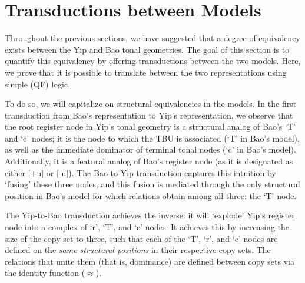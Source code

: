 \documentclass{article}
\newcommand{\ap}{\approx}
\begin{document}
\section{Transductions between Models}
Throughout the previous sections, we have suggested that a degree of equivalency exists between the Yip and Bao tonal geometries. The goal of this section is to quantify this equivalency by offering transductions between the two models. Here, we prove that it is possible to translate between the two representations using simple (QF) logic. \par
To do so, we will capitalize on structural equivalencies in the models. In the first transduction from Bao's representation to Yip's representation, we observe that the root register node in Yip's tonal geometry is a structural analog of Bao's `T' and `c' nodes; it is the node to which the TBU is associated (`T' in Bao's model), as well as the immediate dominator of terminal tonal nodes (`c' in Bao's model). Additionally, it is a featural analog of Bao's register node (as it is designated as either [+u] or [-u]). The Bao-to-Yip transduction captures this intuition by `fusing' these three nodes, and this fusion is mediated through the only structural position in Bao's model for which relations obtain among all three: the `T' node. \par
The Yip-to-Bao transduction achieves the inverse: it will `explode' Yip's register node into a complex of `r', `T', and `c' nodes. It achieves this by increasing the size of the copy set to three, such that each of the `T', `r', and `c' nodes are defined on the \emph{same structural positions} in their respective copy sets. The relations that unite them (that is, dominance) are defined between copy sets via the identity function ($\ap$).
\end{document}
